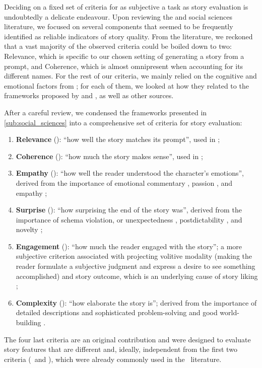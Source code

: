 Deciding on a fixed set of criteria for as subjective a task as story evaluation is undoubtedly a delicate endeavour. Upon reviewing the {\asg} and social sciences literature, we focused on several components that seemed to be frequently identified as reliable indicators of story quality. From the {\asg} literature, we reckoned that a vast majority of the observed criteria could be boiled down to two: Relevance, which is specific to our chosen setting of generating a story from a prompt, and Coherence, which is almost omnipresent when accounting for its different names. For the rest of our criteria, we mainly relied on the cognitive and emotional factors from \citet{bae2021preliminary}; for each of them, we looked at how they related to the frameworks proposed by \citet{mccabe1984makes} and \citet{dickman2003four}, as well as other sources.

After a careful review, we condensed the frameworks presented in \autoref{sub:social_sciences} into a comprehensive set of criteria for story evaluation:
\begin{enumerate}
    \item \textbf{Relevance} (\myre): ``how well the story matches its prompt'', used in \citet{fan2018hierarchical, yao2019plan, jhamtani-berg-kirkpatrick-2020-narrative, akoury2020storium, goldfarb-tarrant-etal-2020-content, bai2021semantics};
    \item \textbf{Coherence} (\mych): ``how much the story makes sense'', used in \citet{khalifa2017deeptingle, xu-etal-2018-skeleton, yao2019plan, jhamtani-berg-kirkpatrick-2020-narrative, akoury2020storium, wang2020narrative, guan2021long, wilmot2021temporal};
    \item \textbf{Empathy} (\myem): ``how well the reader understood the character’s emotions'', derived from the importance of emotional commentary \citep{mccabe1984makes}, passion \citep{dickman2003four}, and empathy \citep{keen2007empathy, bae2021preliminary};
    \item \textbf{Surprise} (\mysu): ``how surprising the end of the story was'', derived from the importance of schema violation, or unexpectedness \citep{schank1978interestingness, bae2021preliminary}, postdictability \citep{behrooz2019story}, and novelty \citep{randall1999narrative};
    \item \textbf{Engagement} (\myeg): ``how much the reader engaged with the story''; a more subjective criterion associated with projecting volitive modality (making the reader formulate a subjective judgment and express a desire to see something accomplished) \citep{toolan2012engagement} and story outcome, which is an underlying cause of story liking \citep{iran1987cognitive}; 
    \item \textbf{Complexity} (\mycx): ``how elaborate the story is''; derived from the importance of detailed descriptions and sophisticated problem-solving \citep{mccabe1984makes} and good world-building \citep{roine2016imaginative}.
\end{enumerate}
The four last criteria are an original contribution and were designed to evaluate story features that are different and, ideally, independent from the first two criteria (\myre\ and \mych), which were already commonly used in the \asg\ literature.

